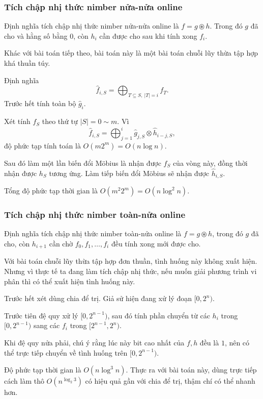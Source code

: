 \documentclass[11pt]{article}
\begin{document}
\subsubsection{Tích chập nhị thức nimber nửa-nửa online}

Định nghĩa tích chập nhị thức nimber nửa-nửa online là \(f=g\circledast h\).
Trong đó \(g\) đã cho và hằng số bằng \(0\), còn \(h_i\) cần được cho sau khi
tính xong \(f_i\).

Khác với bài toán tiếp theo, bài toán này là một bài toán chuỗi lũy thừa tập hợp
khá thuần túy.

Định nghĩa
\[
  \hat f_{i,S}=\bigoplus_{T\subseteq S,\ |T|=i} f_T.
\]
Trước hết tính toàn bộ \(\hat g_i\).

Xét tính \(f_S\) theo thứ tự \(|S|=0\sim m\). Vì
\[
  \hat f_{i,S}=\bigoplus_{j=1}^i \hat g_{j,S}\otimes \hat h_{i-j,S},
\]
độ phức tạp tính toán là \(O(m2^m)=O(n\log n)\).

Sau đó làm một lần biến đổi Möbius là nhận được \(f_S\) của vòng này, đồng thời
nhận được \(h_S\) tương ứng. Làm tiếp biến đổi Möbius sẽ nhận được \(\hat
h_{i,S}\).

Tổng độ phức tạp thời gian là \(O(m^2 2^m)=O(n\log^2 n)\).

\subsubsection{Tích chập nhị thức nimber toàn-nửa online}

Định nghĩa tích chập nhị thức nimber toàn-nửa online là \(f=g\circledast h\),
trong đó \(g\) đã cho, còn \(h_{i+1}\) cần chờ \(f_0,f_1,\ldots,f_i\) đều tính
xong mới được cho.

Với bài toán chuỗi lũy thừa tập hợp đơn thuần, tình huống này không xuất hiện.
Nhưng vì thực tế ta đang làm tích chập nhị thức, nếu muốn giải phương trình vi
phân thì có thể xuất hiện tình huống này.

Trước hết xét dùng chia để trị. Giả sử hiện đang xử lý đoạn \([0,2^n)\).

Trước tiên đệ quy xử lý \([0,2^{n-1})\), sau đó tính phần chuyển từ các \(h_i\)
trong \([0,2^{n-1})\) sang các \(f_i\) trong \([2^{n-1},2^n)\).

Khi đệ quy nửa phải, chú ý rằng lúc này bit cao nhất của \(f,h\) đều là \(1\),
nên có thể trực tiếp chuyển về tình huống trên \([0,2^{n-1})\).

Độ phức tạp thời gian là \(O(n\log^3 n)\). Thực ra với bài toán này, dùng trực
tiếp cách làm thô \(O(n^{\log_2 3})\) có hiệu quả gần với chia để trị, thậm chí
có thể nhanh hơn.
\end{document}
